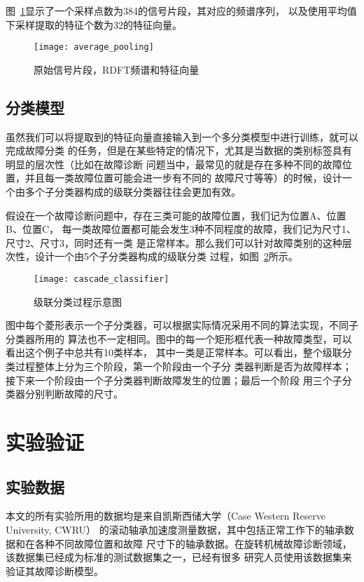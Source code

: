 图~\ref{fig:average_pooling}显示了一个采样点数为384的信号片段，其对应的频谱序列，
以及使用平均值下采样提取的特征个数为32的特征向量。
\begin{figure}[ht] %
  \centering
  \texttt{[image: average\_pooling]}
  \caption{原始信号片段，RDFT频谱和特征向量}
  \label{fig:average_pooling}
\end{figure}

\subsection{分类模型}
\label{subsection:cascade_model}

虽然我们可以将提取到的特征向量直接输入到一个多分类模型中进行训练，就可以完成故障分类
的任务，但是在某些特定的情况下，尤其是当数据的类别标签具有明显的层次性（比如在故障诊断
问题当中，最常见的就是存在多种不同的故障位置，并且每一类故障位置可能会进一步有不同的
故障尺寸等等）的时候，设计一个由多个子分类器构成的级联分类器往往会更加有效。

假设在一个故障诊断问题中，存在三类可能的故障位置，我们记为位置A、位置B、位置C，
每一类故障位置都可能会发生3种不同程度的故障，我们记为尺寸1、尺寸2、尺寸3，同时还有一类
是正常样本。那么我们可以针对故障类别的这种层次性，设计一个由5个子分类器构成的级联分类
过程，如图~\ref{fig:cascade_classifier}所示。
\begin{figure}[ht] %
  \centering
  \texttt{[image: cascade\_classifier]}
  \caption{级联分类过程示意图}
  \label{fig:cascade_classifier}
\end{figure}

图中每个菱形表示一个子分类器，可以根据实际情况采用不同的算法实现，不同子分类器所用的
算法也不一定相同。图中的每一个矩形框代表一种故障类型，可以看出这个例子中总共有10类样本，
其中一类是正常样本。可以看出，整个级联分类过程整体上分为三个阶段，第一个阶段由一个子分
类器判断是否为故障样本；接下来一个阶段由一个子分类器判断故障发生的位置；最后一个阶段
用三个子分类器分别判断故障的尺寸。

\section{实验验证}

\subsection{实验数据}

本文的所有实验所用的数据均是来自凯斯西储大学（Case Western Reserve University, CWRU）
的滚动轴承加速度测量数据，其中包括正常工作下的轴承数据和在各种不同故障位置和故障
尺寸下的轴承数据。在旋转机械故障诊断领域，该数据集已经成为标准的测试数据集之一，已经有很多
研究人员使用该数据集来验证其故障诊断模型。

